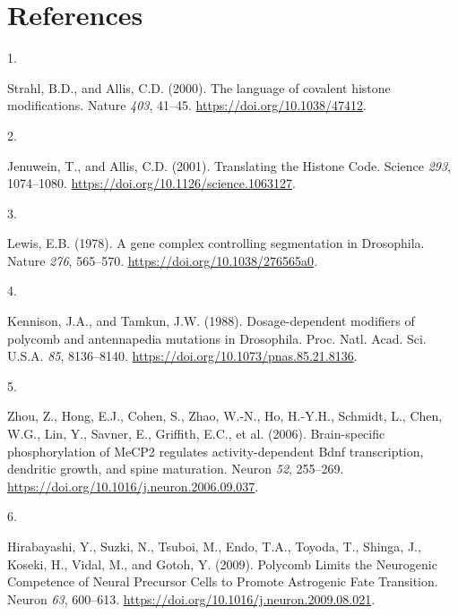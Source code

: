 \documentclass[
]{article}
\newlength{\cslhangindent}
\newlength{\csllabelwidth}
\newlength{\cslentryspacingunit} %
\newenvironment{CSLReferences}[2] %
 {%
  \setlength{\parindent}{0pt}
  \ifodd #1
  \let\oldpar\par
  \def\par{\hangindent=\cslhangindent\oldpar}
  \fi
  \setlength{\parskip}{#2\cslentryspacingunit}
 }%
 {}
\newcommand{\CSLLeftMargin}[1]{\parbox[t]{\csllabelwidth}{#1}}
\newcommand{\CSLRightInline}[1]{\parbox[t]{\linewidth - \csllabelwidth}{#1}\break}
\begin{document}
\hypertarget{references}{%
\section{References}\label{references}}

\hypertarget{refs}{}
\begin{CSLReferences}{0}{0}
\leavevmode{}%
\CSLLeftMargin{1. }%
\CSLRightInline{Strahl, B.D., and Allis, C.D. (2000). The language of
covalent histone modifications. Nature \emph{403}, 41--45.
\url{https://doi.org/10.1038/47412}.}

\leavevmode{}%
\CSLLeftMargin{2. }%
\CSLRightInline{Jenuwein, T., and Allis, C.D. (2001). Translating the
{Histone Code}. Science \emph{293}, 1074--1080.
\url{https://doi.org/10.1126/science.1063127}.}

\leavevmode{}%
\CSLLeftMargin{3. }%
\CSLRightInline{Lewis, E.B. (1978). A gene complex controlling
segmentation in {Drosophila}. Nature \emph{276}, 565--570.
\url{https://doi.org/10.1038/276565a0}.}

\leavevmode{}%
\CSLLeftMargin{4. }%
\CSLRightInline{Kennison, J.A., and Tamkun, J.W. (1988).
Dosage-dependent modifiers of polycomb and antennapedia mutations in
{Drosophila}. Proc. Natl. Acad. Sci. U.S.A. \emph{85}, 8136--8140.
\url{https://doi.org/10.1073/pnas.85.21.8136}.}

\leavevmode{}%
\CSLLeftMargin{5. }%
\CSLRightInline{Zhou, Z., Hong, E.J., Cohen, S., Zhao, W.-N., Ho,
H.-Y.H., Schmidt, L., Chen, W.G., Lin, Y., Savner, E., Griffith, E.C.,
et al. (2006). Brain-specific phosphorylation of {MeCP2} regulates
activity-dependent {Bdnf} transcription, dendritic growth, and spine
maturation. Neuron \emph{52}, 255--269.
\url{https://doi.org/10.1016/j.neuron.2006.09.037}.}

\leavevmode{}%
\CSLLeftMargin{6. }%
\CSLRightInline{Hirabayashi, Y., Suzki, N., Tsuboi, M., Endo, T.A.,
Toyoda, T., Shinga, J., Koseki, H., Vidal, M., and Gotoh, Y. (2009).
Polycomb {Limits} the {Neurogenic Competence} of {Neural Precursor
Cells} to {Promote Astrogenic Fate Transition}. Neuron \emph{63},
600--613. \url{https://doi.org/10.1016/j.neuron.2009.08.021}.}


\end{CSLReferences}
\end{document}
